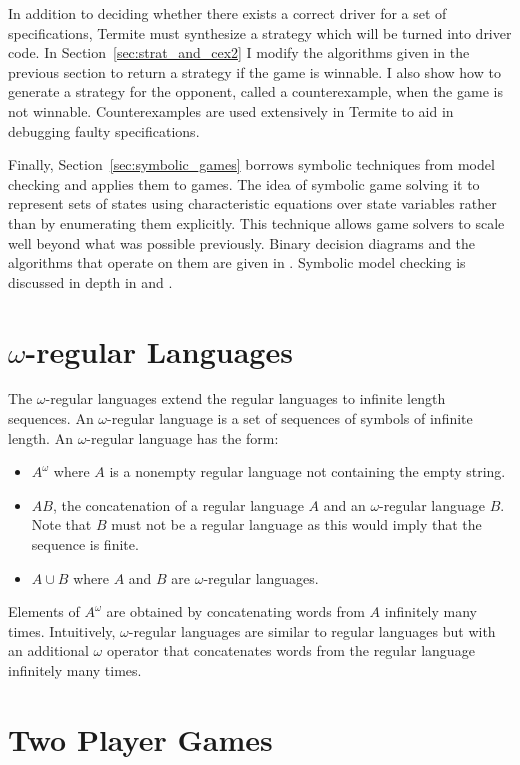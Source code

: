 In addition to deciding whether there exists a correct driver for a set of specifications, Termite must synthesize a strategy which will be turned into driver code. In Section~\ref{sec:strat_and_cex2} I modify the algorithms given in the previous section to return a strategy if the game is winnable. I also show how to generate a strategy for the opponent, called a counterexample, when the game is not winnable. Counterexamples are used extensively in Termite to aid in debugging faulty specifications.

Finally, Section~\ref{sec:symbolic_games} borrows symbolic techniques from model checking and applies them to games. The idea of symbolic game solving it to represent sets of states using characteristic equations over state variables rather than by enumerating them explicitly. This technique allows game solvers to scale well beyond what was possible previously. Binary decision diagrams and the algorithms that operate on them are given in \cite{Bryant_86}. Symbolic model checking is discussed in depth in \cite{Burch_symbolic} and \cite{McMillan_thesis}.

\section{$\omega$-regular Languages}
\label{sec:omega_regular}

The $\omega$-regular languages extend the regular languages to infinite length sequences. An $\omega$-regular language is a set of sequences of symbols of infinite length. An $\omega$-regular language has the form:
\begin{itemize}
    \item $A^\omega$ where $A$ is a nonempty regular language not containing the empty string.
    \item $AB$, the concatenation of a regular language $A$ and an $\omega$-regular language $B$. Note that $B$ must not be a regular language as this would imply that the sequence is finite.
    \item $A \cup B$ where $A$ and $B$ are $\omega$-regular languages.
\end{itemize}

Elements of $A^\omega$ are obtained by concatenating words from $A$ infinitely many times. Intuitively, $\omega$-regular languages are similar to regular languages but with an additional $\omega$ operator that concatenates words from the regular language infinitely many times.

\section{Two Player Games}
\label{sec:two_player}

